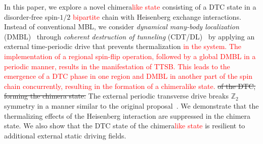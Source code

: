 \documentclass[12pt]{iopart}
\newcommand{\red}[1]{\textcolor{red}{#1}}
\begin{document}

In this paper, we explore a novel chimera\red{like state} consisting of a DTC state in a disorder-free spin-$1/2$ \red{bipartite} chain with Heisenberg exchange interactions. Instead of conventional MBL, we consider \textit{dynamical many-body localization} (DMBL)~\cite{Keser2016, haldar_dynamical_2017,haldar_dynamical_2021,bhattacharyya_transverse_2012,aditya2023dynamical,dutta2014,das_exotic_2010} through \textit{coherent destruction of tunneling} (CDT/DL)~\cite{Grossmann1991,Kayanuma2008} by applying an external time-periodic drive that prevents thermalization \red{in the system. The implementation of a regional spin-flip operation, followed by a global DMBL in a periodic manner, results in the manifestation of TTSB. This leads to the emergence of a DTC phase in one region and DMBL in another part of the spin chain concurrently, resulting in the formation of a chimeralike state.} \sout{of the DTC, forming the chimera state.}  The external periodic transverse drive breaks $\mathbb{Z}_2$ symmetry in a manner similar to the original proposal~\cite{sakurai_phys_nodate}. We demonstrate that the thermalizing effects of the Heisenberg interaction are suppressed in the chimera state. We also show that the DTC state of the chimera\red{like state} is resilient to additional external static driving fields. 
\end{document}
